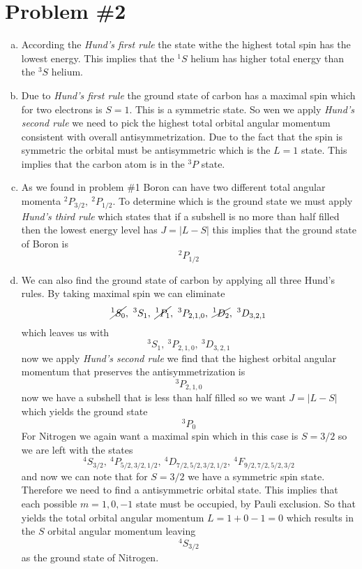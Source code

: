 \documentclass[11pt]{article}
\numberwithin{equation}{section}
\begin{document}
\section{Problem \#2}
\begin{enumerate}[(a)]
\item
According the \emph{Hund's first rule} the state withe the highest total spin has the lowest energy. This implies that the $^1S$ helium has higher total energy than the $^3S$ helium.

\item
Due to \emph{Hund's first rule} the ground state of carbon has a maximal spin which for two electrons is $S=1$. This is a symmetric state. So wen we apply \emph{Hund's second rule} we need to pick the highest total orbital angular momentum consistent with overall antisymmetrization. Due to the fact that the spin is symmetric the orbital must be antisymmetric which is the $L=1$ state. This implies that the carbon atom is in the $^3P$ state.

\item
As we found in problem \#1 Boron can have two different total angular momenta $^2P_{3/2},\ ^2P_{1/2}$. To determine which is the ground state we must apply \emph{Hund's third rule} which states that if a subshell is no more than half filled then the lowest energy level has $J=|L-S|$ this implies that the ground state of Boron is
$$^2P_{1/2}$$

\item
We can also find the ground state of carbon by applying all three Hund's rules. By taking maximal spin we can eliminate 
$$\cancel{^1S_{0}},\ ^3S_{1},\ \cancel{^1P_{1}},\ ^3P_{2,1,0},\ \cancel{^1D_{2}},\ ^3D_{3,2,1}$$
which leaves us with 
$$^3S_{1},\ ^3P_{2,1,0},\ ^3D_{3,2,1}$$
now we apply \emph{Hund's second rule} we find that the highest orbital angular momentum that preserves the antisymmetrization is
$$^3P_{2,1,0}$$
now we have a subshell that is less than half filled so we want $J=|L-S|$ which yields the ground state
$$^3P_{0}$$
For Nitrogen we again want a maximal spin which in this case is $S=3/2$ so we are left with the states
$$^4S_{3/2},\  ^4P_{5/2,3/2,1/2},\ ^4D_{7/2,5/2,3/2,1/2},\ ^4F_{9/2,7/2,5/2,3/2}$$
and now we can note that for $S=3/2$ we have a symmetric spin state. Therefore we need to find a antisymmetric orbital state. This implies that each possible $m=1,0,-1$ state must be occupied, by Pauli exclusion. So that yields the total orbital angular momentum $L = 1 + 0 - 1 = 0$ which results in the $S$ orbital angular momentum leaving 
$$^4S_{3/2}$$
as the ground state of Nitrogen.
\end{enumerate}
\end{document}
